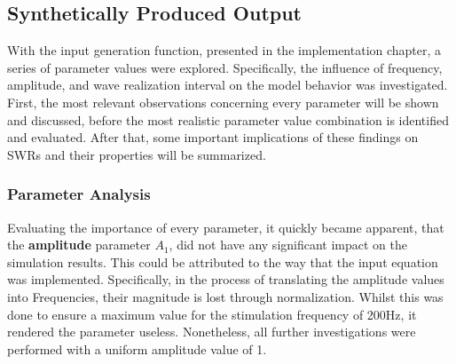        

    \subsection{Synthetically Produced Output}
    With the input generation function, presented in the implementation chapter, a series of parameter values were explored. Specifically, the influence of frequency, amplitude, and wave realization interval on the model behavior was investigated. First, the most relevant observations concerning every parameter will be shown and discussed, before the most realistic parameter value combination is identified and evaluated. After that, some important implications of these findings on SWRs and their properties will be summarized. 
    

        \subsubsection{Parameter Analysis}
        Evaluating the importance of every parameter, it quickly became apparent, that the \textbf{amplitude} parameter \(A_1\), did not have any significant impact on the simulation results. This could be attributed to the way that the input equation was implemented. Specifically, in the process of translating the amplitude values into Frequencies, their magnitude is lost through normalization. Whilst this was done to ensure a maximum value for the stimulation frequency of 200Hz, it rendered the parameter useless. Nonetheless, all further investigations were performed with a uniform amplitude value of 1.
        
